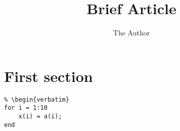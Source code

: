 \documentclass[11pt]{article} %
\title{Brief Article}
\author{The Author}
\begin{document}
\maketitle

\section{First section}


\begin{verbatim}
% \begin{verbatim}
for i = 1:10
	x(i) = a(i);
end
\end{verbatim}

\end{document}

